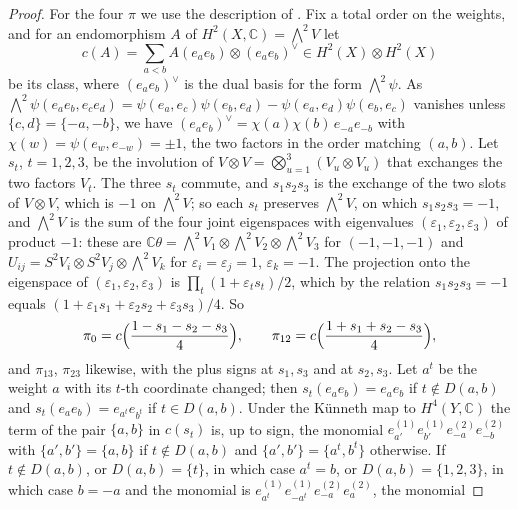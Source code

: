 \documentclass[11pt,reqno]{amsart}
\theoremstyle{plain}
\theoremstyle{definition}
\theoremstyle{remark}
\newcommand{\CC}{\mathbb{C}}
\begin{document}
\begin{proof}
For the four $\pi$ we use the description of . Fix a
total order on the weights, and for an endomorphism $A$ of
$H^{2}(X,\CC)={\textstyle\bigwedge^{2}}V$ let
\[
  c(A)=\sum_{a<b}A(e_{a}e_{b})\otimes(e_{a}e_{b})^{\vee}
  \in H^{2}(X)\otimes H^{2}(X)
\]
be its class, where $(e_{a}e_{b})^{\vee}$ is the dual basis for the form
${\textstyle\bigwedge^{2}}\psi$. As
${\textstyle\bigwedge^{2}}\psi(e_{a}e_{b},e_{c}e_{d})
=\psi(e_{a},e_{c})\psi(e_{b},e_{d})-\psi(e_{a},e_{d})\psi(e_{b},e_{c})$
vanishes unless $\{c,d\}=\{-a,-b\}$, we have
$(e_{a}e_{b})^{\vee}=\chi(a)\chi(b)\,e_{-a}e_{-b}$ with
$\chi(w)=\psi(e_{w},e_{-w})=\pm1$, the two factors in the order matching
$(a,b)$. Let $s_{t}$, $t=1,2,3$, be the involution of
$V\otimes V=\bigotimes_{u=1}^{3}(V_{u}\otimes V_{u})$ that exchanges the two
factors $V_{t}$. The three $s_{t}$ commute, and $s_{1}s_{2}s_{3}$ is the
exchange of the two slots of $V\otimes V$, which is $-1$ on
${\textstyle\bigwedge^{2}}V$; so each $s_{t}$ preserves
${\textstyle\bigwedge^{2}}V$, on which $s_{1}s_{2}s_{3}=-1$, and
${\textstyle\bigwedge^{2}}V$ is the sum of the four joint eigenspaces with
eigenvalues $(\varepsilon_{1},\varepsilon_{2},\varepsilon_{3})$ of product
$-1$: these are $\CC\theta={\textstyle\bigwedge^{2}}V_{1}\otimes
{\textstyle\bigwedge^{2}}V_{2}\otimes{\textstyle\bigwedge^{2}}V_{3}$ for
$(-1,-1,-1)$ and $U_{ij}=S^{2}V_{i}\otimes S^{2}V_{j}\otimes
{\textstyle\bigwedge^{2}}V_{k}$ for $\varepsilon_{i}=\varepsilon_{j}=1$,
$\varepsilon_{k}=-1$. The projection onto the eigenspace of
$(\varepsilon_{1},\varepsilon_{2},\varepsilon_{3})$ is
$\prod_{t}(1+\varepsilon_{t}s_{t})/2$, which by the relation
$s_{1}s_{2}s_{3}=-1$ equals
$(1+\varepsilon_{1}s_{1}+\varepsilon_{2}s_{2}+\varepsilon_{3}s_{3})/4$. So
\[
  \pi_{0}=c\Bigl(\frac{1-s_{1}-s_{2}-s_{3}}{4}\Bigr),\qquad
  \pi_{12}=c\Bigl(\frac{1+s_{1}+s_{2}-s_{3}}{4}\Bigr),
\]
and $\pi_{13}$, $\pi_{23}$ likewise, with the plus signs at $s_{1},s_{3}$
and at $s_{2},s_{3}$. Let $a^{t}$ be the weight $a$ with its $t$-th
coordinate changed; then $s_{t}(e_{a}e_{b})=e_{a}e_{b}$ if $t\notin D(a,b)$
and $s_{t}(e_{a}e_{b})=e_{a^{t}}e_{b^{t}}$ if $t\in D(a,b)$. Under the
K\"unneth map to $H^{4}(Y,\CC)$ the term of the pair $\{a,b\}$ in $c(s_{t})$
is, up to sign, the monomial $e^{(1)}_{a'}e^{(1)}_{b'}e^{(2)}_{-a}e^{(2)}_{-b}$
with $\{a',b'\}=\{a,b\}$ if $t\notin D(a,b)$ and $\{a',b'\}=\{a^{t},b^{t}\}$
otherwise. If $t\notin D(a,b)$, or $D(a,b)=\{t\}$, in which case $a^{t}=b$,
or $D(a,b)=\{1,2,3\}$, in which case $b=-a$ and the monomial is
$e^{(1)}_{a^{t}}e^{(1)}_{-a^{t}}e^{(2)}_{-a}e^{(2)}_{a}$, the monomial

\end{proof}
\end{document}
